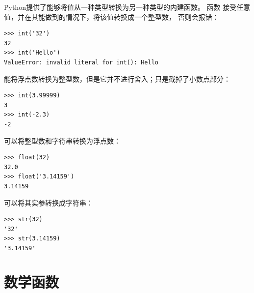 
Python提供了能够将值从一种类型转换为另一种类型的内建函数。
函数  接受任意值，并在其能做到的情况下，将该值转换成一个整型数，
否则会报错：
  
  
  
  

\begin{lstlisting}
>>> int('32')
32
>>> int('Hello')
ValueError: invalid literal for int(): Hello
\end{lstlisting}

%

 能将浮点数转换为整型数，但是它并不进行舍入；只是截掉了小数点部分：

\begin{lstlisting}
>>> int(3.99999)
3
>>> int(-2.3)
-2
\end{lstlisting}

%

 可以将整型数和字符串转换为浮点数：
  
  

\begin{lstlisting}
>>> float(32)
32.0
>>> float('3.14159')
3.14159
\end{lstlisting}

%

 可以将其实参转换成字符串：
  
  

\begin{lstlisting}
>>> str(32)
'32'
>>> str(3.14159)
'3.14159'
\end{lstlisting}

%
\section{数学函数}
  
  


